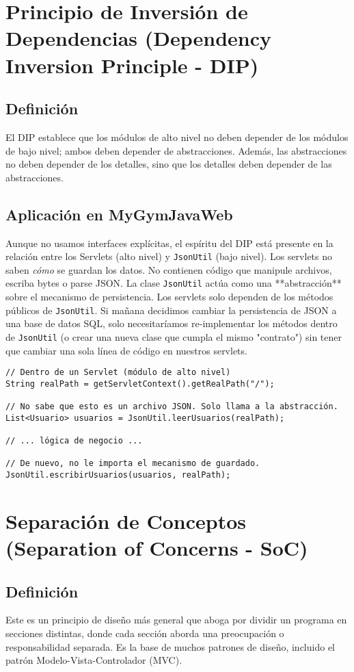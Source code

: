 \documentclass[11pt,a4paper]{article}
\begin{document}
\section{Principio de Inversión de Dependencias (Dependency Inversion Principle - DIP)}
\subsection{Definición}
El DIP establece que los módulos de alto nivel no deben depender de los módulos de bajo nivel; ambos deben depender de abstracciones. Además, las abstracciones no deben depender de los detalles, sino que los detalles deben depender de las abstracciones.
\subsection{Aplicación en MyGymJavaWeb}
Aunque no usamos interfaces explícitas, el espíritu del DIP está presente en la relación entre los Servlets (alto nivel) y \texttt{JsonUtil} (bajo nivel). Los servlets no saben \emph{cómo} se guardan los datos. No contienen código que manipule archivos, escriba bytes o parse JSON.
La clase \texttt{JsonUtil} actúa como una **abstracción** sobre el mecanismo de persistencia. Los servlets solo dependen de los métodos públicos de \texttt{JsonUtil}. Si mañana decidimos cambiar la persistencia de JSON a una base de datos SQL, solo necesitaríamos re-implementar los métodos dentro de \texttt{JsonUtil} (o crear una nueva clase que cumpla el mismo "contrato") sin tener que cambiar una sola línea de código en nuestros servlets.
\begin{lstlisting}[caption={Servlet dependiendo de la abstracción \texttt{JsonUtil}}]
// Dentro de un Servlet (módulo de alto nivel)
String realPath = getServletContext().getRealPath("/");

// No sabe que esto es un archivo JSON. Solo llama a la abstracción.
List<Usuario> usuarios = JsonUtil.leerUsuarios(realPath);

// ... lógica de negocio ...

// De nuevo, no le importa el mecanismo de guardado.
JsonUtil.escribirUsuarios(usuarios, realPath);
\end{lstlisting}

\section{Separación de Conceptos (Separation of Concerns - SoC)}
\subsection{Definición}
Este es un principio de diseño más general que aboga por dividir un programa en secciones distintas, donde cada sección aborda una preocupación o responsabilidad separada. Es la base de muchos patrones de diseño, incluido el patrón Modelo-Vista-Controlador (MVC).
\end{document}
